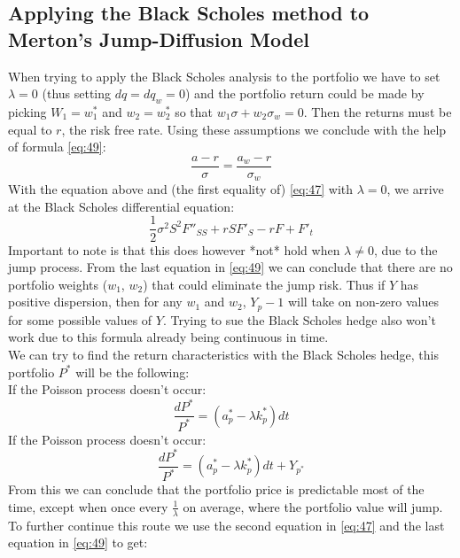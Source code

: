 \documentclass{article}
\begin{document}
\subsection{Applying the Black Scholes method to Merton's Jump-Diffusion Model}
When trying to apply the Black Scholes analysis to the portfolio we have to set $\lambda = 0$ (thus setting $dq = dq_w = 0$) and the portfolio return could be made by picking $W_1 = w_1^{*}$ and $w_2 = w_2^{*}$ so that $w_1 \sigma + w_2 \sigma_w = 0$. Then the returns must be equal to $r$, the risk free rate. Using these assumptions we conclude with the help of formula \ref{eq:49}:
\begin{equation}
    \frac{a - r}{\sigma} = \frac{a_w - r}{\sigma_w}
\end{equation}
With the equation above and (the first equality of) \ref{eq:47} with $\lambda = 0$, we arrive at the Black Scholes differential equation:
\begin{equation}
    \frac{1}{2} \sigma^2 S^2 F''_{SS} + r S F'_S - r F + F'_t
\end{equation}
Important to note is that this does however *not* hold when $\lambda \not= 0$, due to the jump process. From the last equation in \ref{eq:49} we can conclude that there are no portfolio weights ($w_1$, $w_2$) that could eliminate the jump risk. Thus if $Y$ has positive dispersion, then for any $w_1$ and $w_2$, $Y_p - 1$ will take on non-zero values for some possible values of $Y$. Trying to sue the Black Scholes hedge also won't work due to this formula already being continuous in time.\\
We can try to find the return characteristics with the Black Scholes hedge, this portfolio $P^{*}$ will be the following:\\
\newline If the Poisson process doesn't occur:
\begin{equation}
    \frac{dP^{*}}{P^{*}} = (a_p^{*} - \lambda k_p^{*}) dt
\end{equation}
If the Poisson process doesn't occur:
\begin{equation}
    \frac{dP^{*}}{P^{*}} = (a_p^{*} - \lambda k_p^{*}) dt + Y_{p^{*}}
\end{equation}
\newline From this we can conclude that the portfolio price is predictable most of the time, except when once every $\frac{1}{\lambda}$ on average, where the portfolio value will jump. To further continue this route we use the second equation in \ref{eq:47} and the last equation in \ref{eq:49} to get:
\end{document}
